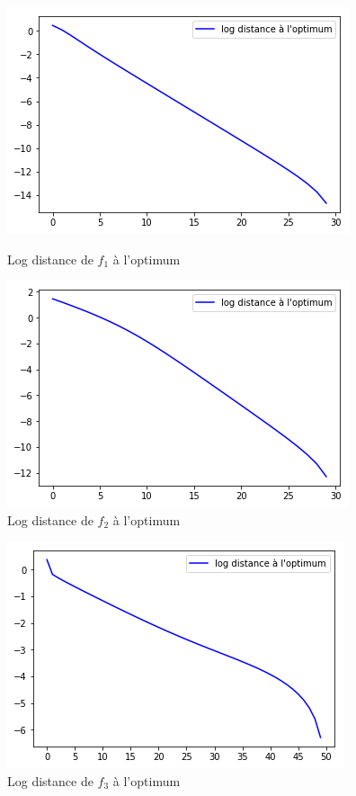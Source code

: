 \documentclass[a4paper]{article}
\begin{document}
\begin{figure}[ht!]
\begin{center}
\begin{minipage}{0.45\textwidth}
\includegraphics[scale=0.5]{f1_logdist.png}
\caption{Log distance de $f_1$ à l'optimum}
\label{f1_logdist}
\end{minipage}\hfill
\begin{minipage}{0.45\textwidth}
\includegraphics[scale=0.5]{f2_logdist.png}
\caption{Log distance de $f_2$ à l'optimum}
\label{f2_logdist}
\end{minipage}
\end{center}
\end{figure}

\begin{figure}[ht!]
\begin{center}
\includegraphics[scale=0.5]{f3_logdist.png}
\caption{Log distance de $f_3$ à l'optimum}
\label{f3_logdist}
\end{center}
\end{figure}
\end{document}
